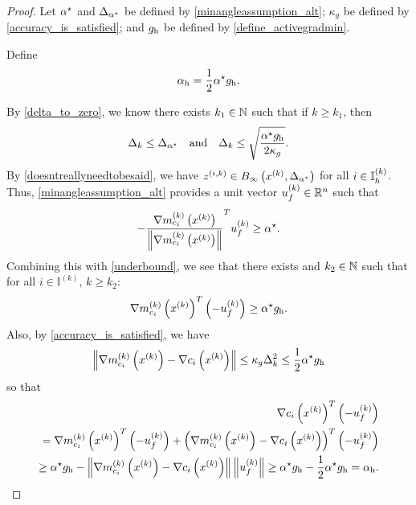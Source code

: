 \begin{proof}

Let 
${ \alpha^{\star} }$ and ${\Delta_{\alpha^{\star}}}$ be defined by \cref{minangleassumption_alt};
$\kappa_g$ be defined by \cref{accuracy_is_satisfied}; 
and ${ g_{\textrm{h}} }$ be defined by \cref{define_activegradmin}.

Define 
\begin{align}
{ \alpha_{\textrm{h}} } = \frac 1 2 { \alpha^{\star} } { g_{\textrm{h}} }. \label{define_minactivealpha}
\end{align}

By \cref{delta_to_zero}, we know there exists $k_1 \in \mathbb N$ such that if $k \ge k_1$, then
\begin{align*}
\Delta_k \le {\Delta_{\alpha^{\star}}} \quad \textrm{and} \quad  \Delta_k \le \sqrt{\frac {{ \alpha^{\star} } { g_{\textrm{h}} }} {2 \kappa_g}}.
\end{align*}
By \cref{doesntreallyneedtobesaid}, we have ${z^{(i, k)}} \in B_{\infty}\left(x^{(k)}, {\Delta_{\alpha^{\star}}} \right)$ for all $i \in { \mathbb I_h^{(k)} }$.
Thus, \cref{minangleassumption_alt} provides a unit vector ${u^{(k)}_f}\in\mathbb R^n$ such that
\begin{align*}
-\frac {{\nabla m_{c_i}^{(k)}\left(x^{(k)}\right)}}{\left\|{\nabla m_{c_i}^{(k)}\left(x^{(k)}\right)}\right\|} ^T{u^{(k)}_f} \ge { \alpha^{\star} }.
\end{align*}
Combining this with \cref{underbound}, we see that there exists and $k_2 \in \mathbb N$ such that for all $i \in \mathbb I^{(k)}$, $k \ge k_2$:
\begin{align*}
 {\nabla m_{c_i}^{(k)}\left(x^{(k)}\right)}^T\left(-{u^{(k)}_f}\right) \ge { \alpha^{\star} } { g_{\textrm{h}} }.
\end{align*}
Also, by \cref{accuracy_is_satisfied}, we have
\begin{align*}
\left\|{\nabla m_{c_i}^{(k)}\left(x^{(k)}\right)} - \nabla c_i\left(x^{(k)}\right) \right\| \le \kappa_g \Delta_k^2 \le \frac 1 2 { \alpha^{\star} } { g_{\textrm{h}} }
\end{align*}
so that
\begin{align*}
\nabla c_i\left(x^{(k)}\right)^T \left(-{u^{(k)}_f}\right) \\
= {\nabla m_{c_i}^{(k)}\left(x^{(k)}\right)}^T\left(-{u^{(k)}_f}\right) + \left({\nabla m_{c_i}^{(k)}\left(x^{(k)}\right)} - \nabla c_i\left(x^{(k)}\right) \right)^T\left(-{u^{(k)}_f}\right) \\
\ge { \alpha^{\star} } { g_{\textrm{h}} } - \left\|{\nabla m_{c_i}^{(k)}\left(x^{(k)}\right)} - \nabla c_i\left(x^{(k)}\right) \right\|\left\|{u^{(k)}_f}\right\|
\ge { \alpha^{\star} } { g_{\textrm{h}} } - \frac 1 2 { \alpha^{\star} } { g_{\textrm{h}} } = { \alpha_{\textrm{h}} }.
\end{align*}


\end{proof}
